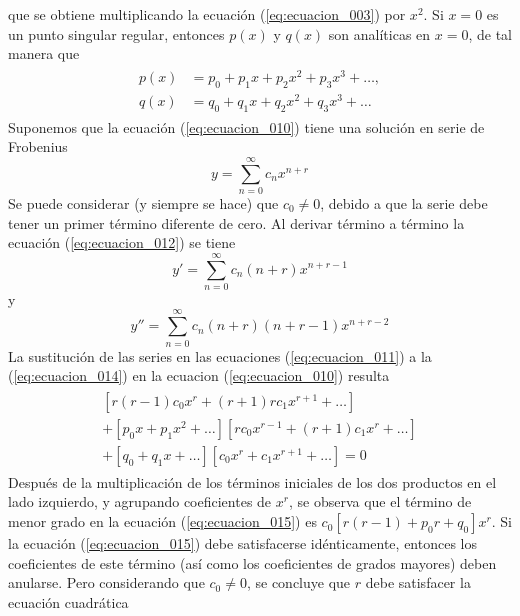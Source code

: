 que se obtiene multiplicando la ecuación (\ref{eq:ecuacion_003}) por $x^{2}$. Si $x = 0$ es un punto singular regular, entonces $p(x)$ y $q(x)$ son analíticas en $x = 0$, de tal manera que
\begin{eqnarray}
\begin{aligned}
p(x) &= p_{0} + p_{1} x + p_{2} x^{2} + p_{3} x^{3} + \ldots , \\
q(x) &= q_{0} + q_{1} x + q_{2} x^{2} + q_{3} x^{3} + \ldots
\end{aligned}
\label{eq:ecuacion_011}
\end{eqnarray}
Suponemos que la ecuación (\ref{eq:ecuacion_010}) tiene una solución en serie de Frobenius
\begin{equation}
y = \sum_{n=0}^{\infty} c_{n} x^{n+r}
\label{eq:ecuacion_012}
\end{equation}
Se puede considerar (y siempre se hace) que $c_{0} \neq 0$, debido a que la serie debe tener un primer término diferente de cero. Al derivar término a término la ecuación (\ref{eq:ecuacion_012}) se tiene
\begin{equation}
y' = \sum_{n=0}^{\infty} c_{n} (n+r) x^{n+r-1} 
\label{eq:ecuacion_013}
\end{equation}
y
\begin{equation}
y'' = \sum_{n=0}^{\infty} c_{n} (n+r)(n+r-1) x^{n+r-2} 
\label{eq:ecuacion_014}
\end{equation}
La sustitución de las series en las ecuaciones (\ref{eq:ecuacion_011}) a la (\ref{eq:ecuacion_014}) en la ecuacion (\ref{eq:ecuacion_010}) resulta
\begin{eqnarray}
\begin{aligned}
\left[ r(r - 1) c_{0} x^{r} + (r + 1) r c_{1} x^{r+1} + \ldots \right]  \\
+ [p_{0} x + p_{1} x^{2} + \ldots] [ r c_{0} x^{r-1} + (r+1) c_{1} x^{r} + \ldots] \\
+ [q_{0} + q_{1} x + \ldots] [ c_{0} x^{r} + c_{1} x^{r+1} + \ldots] = 0 
\end{aligned}
\label{eq:ecuacion_015}
\end{eqnarray}
Después de la multiplicación de los términos iniciales de los dos productos en el lado izquierdo, y agrupando coeficientes de $x^{r}$, se observa que el término de menor grado en la ecuación (\ref{eq:ecuacion_015}) es $c_{0}[r(r - 1)+ p_{0}r + q_{0}]x^{r}$. Si la ecuación (\ref{eq:ecuacion_015}) debe satisfacerse idénticamente, entonces los coeficientes de este término (así como los coeficientes de grados mayores) deben anularse. Pero considerando que $c_{0} \neq 0$, se concluye que $r$ debe satisfacer la ecuación cuadrática
